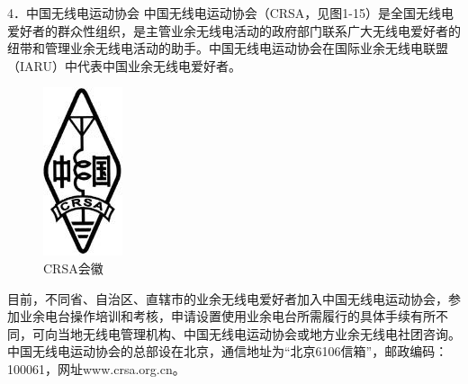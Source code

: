 \documentclass[12pt,UTF8]{ctexbook}
\begin{document}
4．中国无线电运动协会
中国无线电运动协会（CRSA，见图1-15）是全国无线电爱好者的群众性组织，是主管业余无线电活动的政府部门联系广大无线电爱好者的纽带和管理业余无线电活动的助手。中国无线电运动协会在国际业余无线电联盟（IARU）中代表中国业余无线电爱好者。

\begin{figure}[htbp]
	\centering
	\includegraphics[width=0.7\linewidth]{15}
	\caption{CRSA会徽}
	\label{fig:1}
\end{figure}

目前，不同省、自治区、直辖市的业余无线电爱好者加入中国无线电运动协会，参加业余电台操作培训和考核，申请设置使用业余电台所需履行的具体手续有所不同，可向当地无线电管理机构、中国无线电运动协会或地方业余无线电社团咨询。中国无线电运动协会的总部设在北京，通信地址为“北京6106信箱”，邮政编码：100061，网址www.crsa.org.cn。
\end{document}
